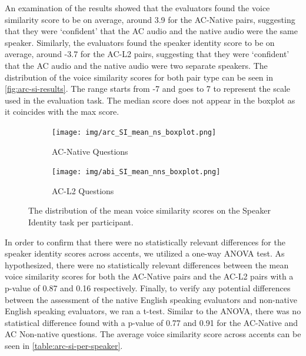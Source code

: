 \documentclass
[
    a4paper,
    twoside,
    12pt,
]
{report}
\begin{document}
An examination of the results showed that the evaluators found the voice
similarity score to be on average, around 3.9 for the AC-Native pairs,
suggesting that they were `confident' that the AC audio and the native
audio were the same speaker. Similarly, the evaluators found the speaker
identity score to be on average, around -3.7 for the AC-L2 pairs,
suggesting that they were `confident' that the AC audio and the native
audio were two separate speakers. The distribution of the voice
similarity scores for both pair type can be seen in
\autoref{fig:arc-si-results}. The range starts from -7 and goes to 7 to
represent the scale used in the evaluation task. The median score does
not appear in the boxplot as it coincides with the max score.

\begin{figure}[]
   \centering
   \begin{subfigure}[b]{1\textwidth}
      \texttt{[image: img/arc\_SI\_mean\_ns\_boxplot.png]}
         \caption{AC-Native Questions}
         \label{fig:arc-si-ns-results}
   \end{subfigure}
   \quad
   \begin{subfigure}[b]{1\textwidth}
      \texttt{[image: img/abi\_SI\_mean\_nns\_boxplot.png]}
         \caption{AC-L2 Questions}
         \label{fig:arc-si-nns-results}
   \end{subfigure} 
   \quad
   \caption{The distribution of the mean voice similarity scores on the Speaker Identity task per participant.}
   \label{fig:arc-si-results}
\end{figure}

In order to confirm that there were no statistically relevant
differences for the speaker identity scores across accents, we utilized
a one-way ANOVA test. As hypothesized, there were no statistically
relevant differences between the mean voice similarity scores for both
the AC-Native pairs and the AC-L2 pairs with a p-value of 0.87 and 0.16
respectively. Finally, to verify any potential differences between the
assessment of the native English speaking evaluators and non-native
English speaking evaluators, we ran a t-test. Similar to the ANOVA,
there was no statistical difference found with a p-value of 0.77 and
0.91 for the AC-Native and AC Non-native questions. The average voice
similarity score across accents can be seen in
\autoref{table:arc-si-per-speaker}.
\end{document}
